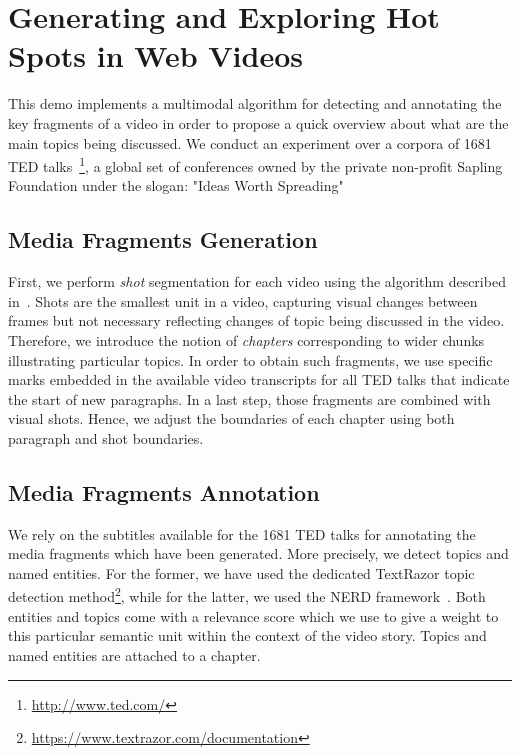 \documentclass{llncs}
\begin{document}

\section{Generating and Exploring Hot Spots in Web Videos}
\label{sec:hotspots}
This demo implements a multimodal algorithm for detecting and annotating the key fragments of a video in order to propose a quick overview about what are the main topics being discussed. We conduct an experiment over a corpora of 1681 TED talks~\footnote{\url{http://www.ted.com/}}, a global set of conferences owned by the private non-profit Sapling Foundation under the slogan: "Ideas Worth Spreading"

\subsection{Media Fragments Generation}
\label{sec:fragments-generation}
First, we perform \emph{shot} segmentation for each video using the algorithm described in~\cite{sidiropoulos2011temporal}. Shots are the smallest unit in a video, capturing visual changes between frames but not necessary reflecting changes of topic being discussed in the video. Therefore, we introduce the notion of \emph{chapters} corresponding to wider chunks illustrating particular topics. In order to obtain such fragments, we use specific marks embedded in the available video transcripts for all TED talks that indicate the start of new paragraphs. In a last step, those fragments are combined with visual shots. Hence, we adjust the boundaries of each chapter using both paragraph and shot boundaries.

\subsection{Media Fragments Annotation}
\label{sec:fragments-annotation}
We rely on the subtitles available for the 1681 TED talks for annotating the media fragments which have been generated. More precisely, we detect topics and named entities. For the former, we have used the dedicated TextRazor topic detection method\footnote{\url{https://www.textrazor.com/documentation}}, while for the latter, we used the NERD framework~\cite{Rizzo2012b}. Both entities and topics come with a relevance score which we use to give a weight to this particular semantic unit within the context of the video story. Topics and named entities are attached to a chapter.
\end{document}
